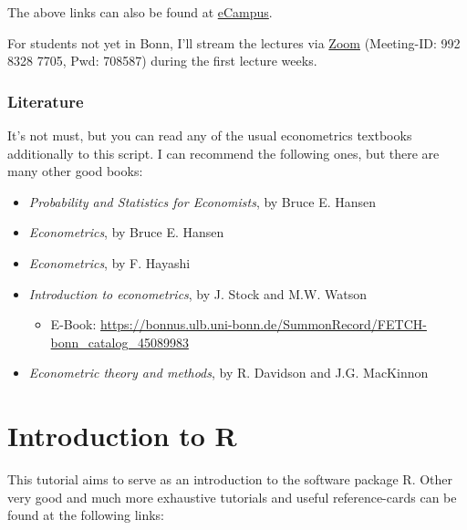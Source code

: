 \documentclass[
  letterpaper,
  DIV=11,
  numbers=noendperiod]{scrreprt}
\providecommand{\tightlist}{%
  \setlength{\itemsep}{0pt}\setlength{\parskip}{0pt}}\usepackage{longtable,booktabs,array}
\theoremstyle{definition}
\theoremstyle{plain}
\theoremstyle{plain}
\theoremstyle{remark}
\begin{document}
The above links can also be found at
\href{https://ecampus.uni-bonn.de/goto_ecampus_crs_2700232.html}{eCampus}.

For students not yet in Bonn, I'll stream the lectures via
\href{https://uni-bonn.zoom.us/j/99283287705?pwd=UHFoRTlwYkNqb0k2ODRjdEluY2FXZz09}{Zoom}
(Meeting-ID: 992 8328 7705, Pwd: 708587) during the first lecture weeks.

\hypertarget{literature}{%
\subsection*{Literature}\label{literature}}

It's not must, but you can read any of the usual econometrics textbooks
additionally to this script. I can recommend the following ones, but
there are many other good books:

\begin{itemize}
\tightlist
\item
  \emph{Probability and Statistics for Economists}, by Bruce E. Hansen
\item
  \emph{Econometrics}, by Bruce E. Hansen
\item
  \emph{Econometrics}, by F. Hayashi
\item
  \emph{Introduction to econometrics}, by J. Stock and M.W. Watson

  \begin{itemize}
  \tightlist
  \item
    E-Book:
    \url{https://bonnus.ulb.uni-bonn.de/SummonRecord/FETCH-bonn_catalog_45089983}
  \end{itemize}
\item
  \emph{Econometric theory and methods}, by R. Davidson and J.G.
  MacKinnon
\end{itemize}


\hypertarget{introduction-to-r}{%
\chapter{Introduction to R}\label{introduction-to-r}}

This tutorial aims to serve as an introduction to the software package
R. Other very good and much more exhaustive tutorials and useful
reference-cards can be found at the following links:
\end{document}
